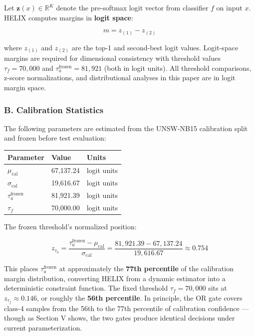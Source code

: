 \documentclass[
  conference]{IEEEtran}
\newcounter{none} %
\begin{document}
Let \(\mathbf{z}(x) \in \mathbb{R}^K\) denote the pre-softmax logit
vector from classifier \(f\) on input \(x\). HELIX computes margins in
\textbf{logit space}:

\[m = z_{(1)} - z_{(2)}\]

where \(z_{(1)}\) and \(z_{(2)}\) are the top-1 and second-best logit
values. Logit-space margins are required for dimensional consistency
with threshold values \(\tau_f = 70{,}000\) and
\(\tau_a^{\text{frozen}} = 81{,}921\) (both in logit units). All
threshold comparisons, z-score normalizations, and distributional
analyses in this paper are in logit margin space.

\subsubsection{B. Calibration
Statistics}\label{b.-calibration-statistics}

The following parameters are estimated from the UNSW-NB15 calibration
split and frozen before test evaluation:

{\def\LTcaptype{none} %
\begin{longtable}[]{@{}lll@{}}
\toprule\noalign{}
Parameter & Value & Units \\
\midrule\noalign{}
\endhead
\bottomrule\noalign{}
\endlastfoot
\(\mu_{\text{cal}}\) & 67,137.24 & logit units \\
\(\sigma_{\text{cal}}\) & 19,616.67 & logit units \\
\(\tau_a^{\text{frozen}}\) & 81,921.39 & logit units \\
\(\tau_f\) & 70,000.00 & logit units \\
\end{longtable}
}

The frozen threshold's normalized position:

\[z_{\tau_a} = \frac{\tau_a^{\text{frozen}} - \mu_{\text{cal}}}{\sigma_{\text{cal}}} = \frac{81{,}921.39 - 67{,}137.24}{19{,}616.67} \approx 0.754\]

This places \(\tau_a^{\text{frozen}}\) at approximately the \textbf{77th
percentile} of the calibration margin distribution, converting HELIX
from a dynamic estimator into a deterministic constraint function. The
fixed threshold \(\tau_f = 70{,}000\) sits at
\(z_{\tau_f} \approx 0.146\), or roughly the \textbf{56th percentile}.
In principle, the OR gate covers class-4 samples from the 56th to the
77th percentile of calibration confidence --- though as Section V shows,
the two gates produce identical decisions under current
parameterization.
\end{document}
